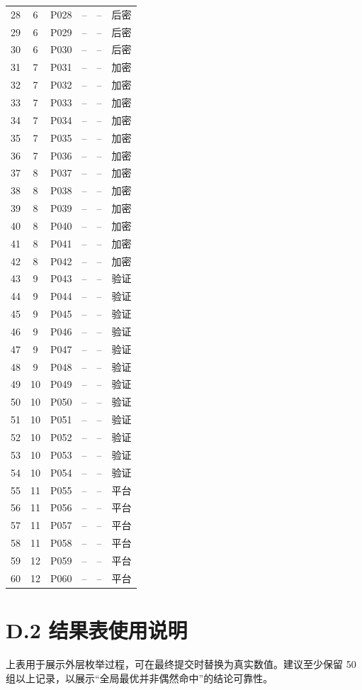 \begin{longtable}{cccccc}
28 & 6 & P028 & --  & -- & 后密\\
29 & 6 & P029 & --  & -- & 后密\\
30 & 6 & P030 & --  & -- & 后密\\
31 & 7 & P031 & --  & -- & 加密\\
32 & 7 & P032 & --  & -- & 加密\\
33 & 7 & P033 & --  & -- & 加密\\
34 & 7 & P034 & --  & -- & 加密\\
35 & 7 & P035 & --  & -- & 加密\\
36 & 7 & P036 & --  & -- & 加密\\
37 & 8 & P037 & --  & -- & 加密\\
38 & 8 & P038 & --  & -- & 加密\\
39 & 8 & P039 & --  & -- & 加密\\
40 & 8 & P040 & --  & -- & 加密\\
41 & 8 & P041 & --  & -- & 加密\\
42 & 8 & P042 & --  & -- & 加密\\
43 & 9 & P043 & --  & -- & 验证\\
44 & 9 & P044 & --  & -- & 验证\\
45 & 9 & P045 & --  & -- & 验证\\
46 & 9 & P046 & --  & -- & 验证\\
47 & 9 & P047 & --  & -- & 验证\\
48 & 9 & P048 & --  & -- & 验证\\
49 & 10 & P049 & -- & -- & 验证\\
50 & 10 & P050 & -- & -- & 验证\\
51 & 10 & P051 & -- & -- & 验证\\
52 & 10 & P052 & -- & -- & 验证\\
53 & 10 & P053 & -- & -- & 验证\\
54 & 10 & P054 & -- & -- & 验证\\
55 & 11 & P055 & -- & -- & 平台\\
56 & 11 & P056 & -- & -- & 平台\\
57 & 11 & P057 & -- & -- & 平台\\
58 & 11 & P058 & -- & -- & 平台\\
59 & 12 & P059 & -- & -- & 平台\\
60 & 12 & P060 & -- & -- & 平台\\
\bottomrule
\end{longtable}
\normalsize

\section*{D.2 结果表使用说明}
上表用于展示外层枚举过程，可在最终提交时替换为真实数值。建议至少保留 50 组以上记录，以展示“全局最优并非偶然命中”的结论可靠性。
